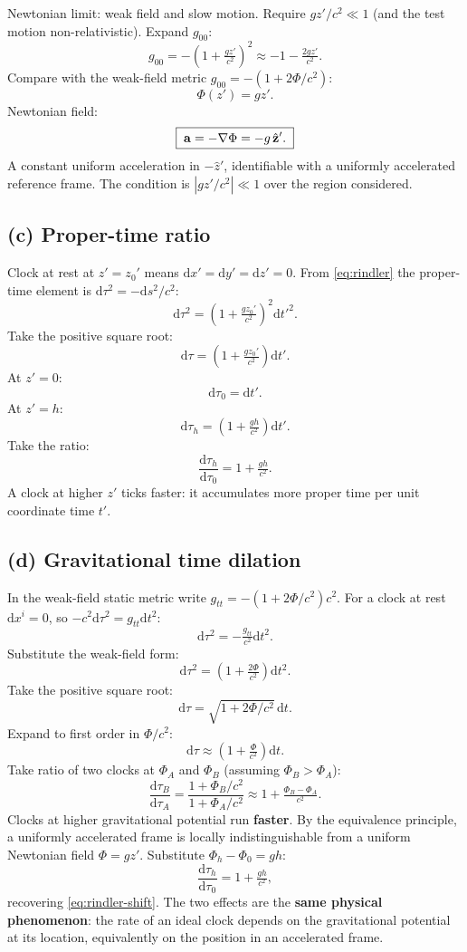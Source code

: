 \documentclass[11pt]{article}
\newcommand{\de}{\mathrm{d}}
\begin{document}
Newtonian limit: weak field and slow motion. Require $gz'/c^2 \ll 1$ (and the test motion non-relativistic). Expand $g_{00}$:
\[ g_{00} = -\left(1+\tfrac{gz'}{c^2}\right)^{\!2} \approx -1 - \tfrac{2gz'}{c^2}. \]
Compare with the weak-field metric $g_{00} = -(1+2\Phi/c^2)$:
\[ \Phi(z') = g z'. \]
Newtonian field:
\[ \boxed{\;\vb a = -\nabla\Phi = -g\,\hat{\vb z}'.\;} \]
A constant uniform acceleration in $-\hat z'$, identifiable with a uniformly accelerated reference frame. The condition is $|gz'/c^2|\ll 1$ over the region considered.

\subsection*{(c) Proper-time ratio}

Clock at rest at $z' = z_0'$ means $\de x' = \de y' = \de z' = 0$. From \eqref{eq:rindler} the proper-time element is $\de\tau^2 = -\de s^2/c^2$:
\[ \de\tau^2 = \left(1+\tfrac{gz_0'}{c^2}\right)^{\!2}\de t'^2. \]
Take the positive square root:
\[ \de\tau = \left(1+\tfrac{gz_0'}{c^2}\right)\de t'. \]
At $z' = 0$:
\[ \de\tau_0 = \de t'. \]
At $z' = h$:
\[ \de\tau_h = \left(1+\tfrac{gh}{c^2}\right)\de t'. \]
Take the ratio:
\begin{equation}
\boxed{\;\frac{\de\tau_h}{\de\tau_0} = 1 + \tfrac{gh}{c^2}.\;}
\label{eq:rindler-shift}
\end{equation}
A clock at higher $z'$ ticks faster: it accumulates more proper time per unit coordinate time $t'$.

\subsection*{(d) Gravitational time dilation}

In the weak-field static metric write $g_{tt} = -(1+2\Phi/c^2)c^2$. For a clock at rest $\de x^i=0$, so $-c^2\de\tau^2 = g_{tt}\de t^2$:
\[ \de\tau^2 = -\tfrac{g_{tt}}{c^2}\de t^2. \]
Substitute the weak-field form:
\[ \de\tau^2 = \left(1+\tfrac{2\Phi}{c^2}\right)\de t^2. \]
Take the positive square root:
\[ \de\tau = \sqrt{1+2\Phi/c^2}\,\de t. \]
Expand to first order in $\Phi/c^2$:
\[ \de\tau \approx \left(1+\tfrac{\Phi}{c^2}\right)\de t. \]
Take ratio of two clocks at $\Phi_A$ and $\Phi_B$ (assuming $\Phi_B > \Phi_A$):
\[ \frac{\de\tau_B}{\de\tau_A} = \frac{1+\Phi_B/c^2}{1+\Phi_A/c^2} \approx 1 + \tfrac{\Phi_B-\Phi_A}{c^2}. \]
Clocks at higher gravitational potential run \textbf{faster}. By the equivalence principle, a uniformly accelerated frame is locally indistinguishable from a uniform Newtonian field $\Phi = gz'$. Substitute $\Phi_h - \Phi_0 = gh$:
\[ \frac{\de\tau_h}{\de\tau_0} = 1 + \tfrac{gh}{c^2}, \]
recovering \eqref{eq:rindler-shift}. The two effects are the \textbf{same physical phenomenon}: the rate of an ideal clock depends on the gravitational potential at its location, equivalently on the position in an accelerated frame.
\end{document}
